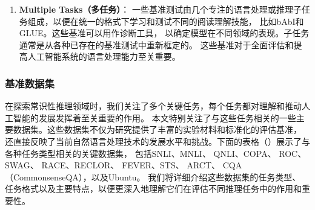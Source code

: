 \begin{enumerate}
  \item \textbf{Multiple Tasks（多任务）}：
  一些基准测试由几个专注的语言处理或推理子任务组成，以便在统一的格式下学习和测试不同的阅读理解技能，
  比如bAbI\cite{weston2016towards}和GLUE\cite{wang2018glue}。这些基准可以用作诊断工具，
  以确定模型在不同领域的表现。子任务通常是从各种已存在的基准测试中重新框定的\cite{white2017inference}。
  这些基准对于全面评估和提高人工智能系统的语言处理能力至关重要。
\end{enumerate}

\subsubsection{基准数据集}
\label{sec1:benchmarks}
在探索常识性推理领域时，我们关注了多个关键任务，每个任务都对理解和推动人工智能的发展发挥着至关重要的作用。
本文特别关注了与这些任务相关的一些主要数据集。这些数据集不仅为研究提供了丰富的实验材料和标准化的评估基准，
还直接反映了当前自然语言处理技术的发展水平和挑战。下面的表格（）展示了与各种任务类型相关的关键数据集，
包括SNLI\cite{bowman2015large}、MNLI\cite{williams2018broad}、
QNLI\cite{wang2018glue}、COPA\cite{roemmele2011choice}、
ROC\cite{mostafazadeh2016corpus}、SWAG\cite{zellers2018swag}、
RACE\cite{lai2017race}、RECLOR\cite{yu2020reclor}、
FEVER\cite{thorne2018fever}、STS\cite{schuster2019towards}、
ARCT\cite{habernal2018argument}、
CQA（CommonsenseQA）\cite{talmor2019commonsenseqa}，以及Ubuntu\cite{lowe2015ubuntu}。
我们将详细介绍这些数据集的任务类型、
任务格式以及主要特点，以便更深入地理解它们在评估不同推理任务中的作用和重要性。

